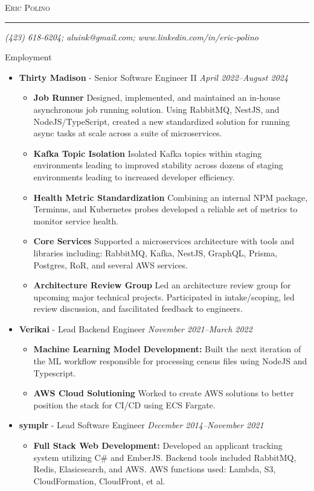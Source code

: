 \documentclass[11pt,oneside]{article}
\makeatletter
\newcommand{\name}{Eric Polino}
\newcommand{\phone}{(423) 618-6204}
\newcommand{\email}{aluink@gmail.com}
\newcommand{\linkedin}{www.linkedin.com/in/eric-polino}
\newcommand{\bigname}[1]{
	\begin{center}\fontfamily{phv}\selectfont\Huge\scshape#1\end{center}
}
\newenvironment{ressection}[1]{
	\vspace{4pt}
	{\fontfamily{phv}\selectfont\Large#1}
	\begin{itemize}
	\vspace{3pt}
}{
	\end{itemize}
}
\newcommand{\ressubitem}[1]{
	\vspace{-1pt}
	\item \begin{flushleft} #1 \end{flushleft}
}
\newcommand{\resbigitem}[3]{
	\vspace{-5pt}
	\item
	{\textbf{#1} - #2 \hfill \textit{#3}}
}
\newenvironment{restitledposition}[3]{
	\resbigitem{#1}{#2}{#3}
	\vspace{-2pt}
	\begin{itemize}
}{
	\end{itemize}
}
\makeatother
\begin{document}
 \selectfont

\bigname{\name}

\vspace{-8pt} \rule{\textwidth}{1pt}

\vspace{-1pt} {\small\itshape \hfill \phone; \email; \linkedin \hfill}

\vspace{8 pt}

\begin{ressection}{Employment}
	\begin{restitledposition}{Thirty Madison}{Senior Software Engineer II}{April 2022--August 2024}
		\ressubitem{\textbf{Job Runner} Designed, implemented, and maintained an in-house asynchronous job running
		solution. Using RabbitMQ, NestJS, and NodeJS/TypeScript, created a new standardized solution for running async
		tasks at scale across a suite of microservices.}
		\ressubitem{\textbf{Kafka Topic Isolation} Isolated Kafka topics within staging environments
		leading to improved stability across dozens of staging environments leading to increased developer efficiency.}
		\ressubitem{\textbf{Health Metric Standardization} Combining an internal NPM package, Terminus, and Kubernetes
		probes developed a reliable set of metrics to monitor service health.}
		\ressubitem{\textbf{Core Services} Supported a microservices architecture with tools and libraries including:
		RabbitMQ, Kafka, NestJS, GraphQL, Prisma, Postgres, RoR, and several AWS services.}
		\ressubitem{\textbf{Architecture Review Group} Led an architecture review group for upcoming major technical projects.
		Participated in intake/scoping, led review discussion, and fascilitated feedback to engineers.}
	\end{restitledposition}
	\begin{restitledposition}{Verikai}{Lead Backend Engineer}{November 2021--March 2022}
		\ressubitem{\textbf{Machine Learning Model Development:} Built the next iteration of the ML workflow responsible
		for processing census files using NodeJS and Typescript.}
		\ressubitem{\textbf{AWS Cloud Solutioning} Worked to create AWS solutions to better position the stack for CI/CD
		using ECS Fargate.}
	\end{restitledposition}
	\begin{restitledposition}{symplr}{Lead Software Engineer}{December 2014--November 2021}
    \ressubitem{\textbf{Full Stack Web Development:} Developed an applicant tracking system utilizing C\# and EmberJS.
		Backend tools included RabbitMQ, Redis, Elasicsearch, and AWS. AWS functions used: Lambda, S3,
		CloudFormation, CloudFront, et al.}


\end{restitledposition}
\end{ressection}
\end{document}
